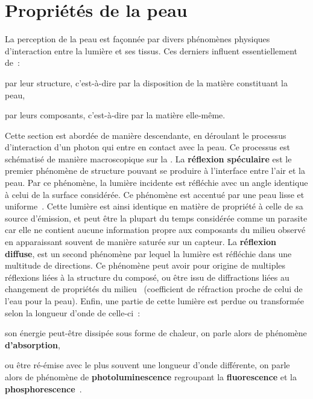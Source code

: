 \section{Propriétés de la peau}
La perception de la peau est façonnée par divers phénomènes physiques d'interaction entre la lumière et ses tissus. Ces derniers influent essentiellement de~:~
\begin{inlinerate}
    \item par leur structure, c’est-à-dire par la disposition de la matière constituant la peau,
    \item par leurs composants, c’est-à-dire par la matière elle-même.
\end{inlinerate}
Cette section est abordée de manière descendante, en déroulant le processus d'interaction d'un photon qui entre en contact avec la peau. Ce processus est schématisé de manière macroscopique sur la . La \textbf{réflexion spéculaire} est le premier phénomène de structure pouvant se produire à l'interface entre l'air et la peau. Par ce phénomène, la lumière incidente est réfléchie avec un angle identique à celui de la surface considérée. Ce phénomène est accentué par une peau lisse et uniforme~\cite{Yang2009}. Cette lumière est ainsi identique en matière de propriété à celle de sa source d'émission, et peut être la plupart du temps considérée comme un parasite car elle ne contient aucune information propre aux composants du milieu observé en apparaissant souvent de manière saturée sur un capteur. La \textbf{réflexion diffuse}, est un second phénomène par lequel la lumière est réfléchie dans une multitude de directions. Ce phénomène peut avoir pour origine de multiples réflexions liées à la structure du composé, ou être issu de diffractions liées au changement de propriétés du milieu~\cite{Yang2009} (coefficient de réfraction proche de celui de l'eau pour la peau). Enfin, une partie de cette lumière est perdue ou transformée selon la longueur d'onde de celle-ci~:
\begin{inlinerate}
    \item son énergie peut-être dissipée sous forme de chaleur, on parle alors de phénomène \textbf{d'absorption},
    \item ou être ré-émise avec le plus souvent une longueur d'onde différente, on parle alors de phénomène de \textbf{photoluminescence} regroupant la \textbf{fluorescence} et la \textbf{phosphorescence}~\cite{Kollias2002}.
\end{inlinerate}\par

